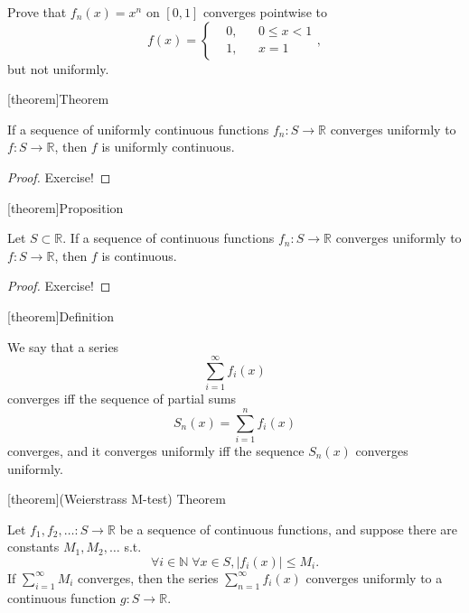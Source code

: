 \documentclass[12pt]{report}
\theoremstyle{definition}
\begin{document}
\begin{ex}
    Prove that $f_n(x) = x^{n}$ on $[0,1]$ converges pointwise to \[
        f(x) = \left\{\begin{align*}
            & 0, && 0 \le x < 1 \\
            & 1, && x = 1
        \end{align*}\right.,
    \]but not uniformly.
\end{ex} 

[theorem]{Theorem}
\begin{uniformly continuous function converged from}
    If a sequence of uniformly continuous functions $f_n:S\rightarrow\mathbb{R}$
    converges uniformly to $f:S\rightarrow\mathbb{R}$,
    then $f$ is uniformly continuous.
\end{uniformly continuous function converged from}

\begin{proof}
    Exercise!
\end{proof} 

[theorem]{Proposition}
\begin{continuous function converged from}
    Let $S\subset\mathbb{R}$.
    If a sequence of continuous functions $f_n:S\rightarrow\mathbb{R}$
    converges uniformly to $f:S\rightarrow\mathbb{R}$,
    then $f$ is continuous.
\end{continuous function converged from}

\begin{proof}
    Exercise!
\end{proof} 

[theorem]{Definition}
\begin{function series convergence}
    We say that a series \[
        \sum_{i=1}^{\infty} f_i(x)
    \]converges iff the sequence of partial sums\[
        S_n(x)=\sum_{i=1}^{n} f_i(x)
    \]converges, and it converges uniformly iff the sequence $S_n(x)$
    converges uniformly.
\end{function series convergence}

[theorem]{(Weierstrass M-test) Theorem}
\begin{Weierstrass M-test}
    Let $f_1,f_2,\ldots:S\rightarrow\mathbb{R}$ be a sequence of continuous
    functions, and suppose there are constants $M_1,M_2,\ldots$ s.t.\[
        \forall i\in\mathbb{N} \;\forall x\in S, |f_i(x)|\le M_i.
    \]If $\sum_{i=1}^{\infty} M_i$ converges, then the series
    $\sum_{n=1}^{\infty} f_i(x)$ converges uniformly to a continuous function
    $g:S\rightarrow\mathbb{R}$.
\end{Weierstrass M-test}
\end{document}
